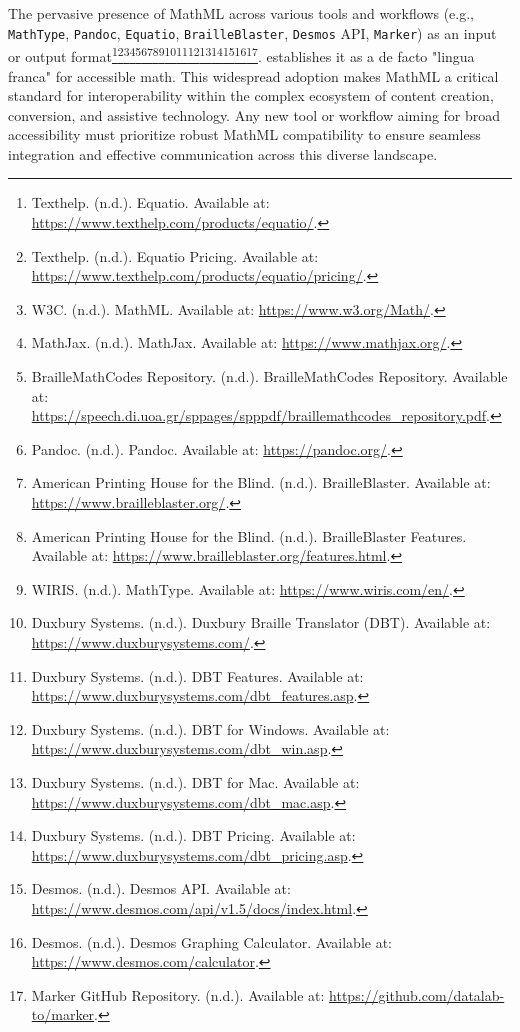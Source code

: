 The pervasive presence of MathML across various tools and workflows (e.g., \texttt{MathType}, \texttt{Pandoc}, \texttt{Equatio}, \texttt{BrailleBlaster}, \texttt{Desmos} API, \texttt{Marker}) as an input or output format\footnote{Texthelp. (n.d.). Equatio. Available at: \url{https://www.texthelp.com/products/equatio/}.}\footnote{Texthelp. (n.d.). Equatio Pricing. Available at: \url{https://www.texthelp.com/products/equatio/pricing/}.}\footnote{W3C. (n.d.). MathML. Available at: \url{https://www.w3.org/Math/}.}\footnote{MathJax. (n.d.). MathJax. Available at: \url{https://www.mathjax.org/}.}\footnote{BrailleMathCodes Repository. (n.d.). BrailleMathCodes Repository. Available at: \url{https://speech.di.uoa.gr/sppages/spppdf/braillemathcodes_repository.pdf}.}\footnote{Pandoc. (n.d.). Pandoc. Available at: \url{https://pandoc.org/}.}\footnote{American Printing House for the Blind. (n.d.). BrailleBlaster. Available at: \url{https://www.brailleblaster.org/}.}\footnote{American Printing House for the Blind. (n.d.). BrailleBlaster Features. Available at: \url{https://www.brailleblaster.org/features.html}.}\footnote{WIRIS. (n.d.). MathType. Available at: \url{https://www.wiris.com/en/}.}\footnote{Duxbury Systems. (n.d.). Duxbury Braille Translator (DBT). Available at: \url{https://www.duxburysystems.com/}.}\footnote{Duxbury Systems. (n.d.). DBT Features. Available at: \url{https://www.duxburysystems.com/dbt_features.asp}.}\footnote{Duxbury Systems. (n.d.). DBT for Windows. Available at: \url{https://www.duxburysystems.com/dbt_win.asp}.}\footnote{Duxbury Systems. (n.d.). DBT for Mac. Available at: \url{https://www.duxburysystems.com/dbt_mac.asp}.}\footnote{Duxbury Systems. (n.d.). DBT Pricing. Available at: \url{https://www.duxburysystems.com/dbt_pricing.asp}.}\footnote{Desmos. (n.d.). Desmos API. Available at: \url{https://www.desmos.com/api/v1.5/docs/index.html}.}\footnote{Desmos. (n.d.). Desmos Graphing Calculator. Available at: \url{https://www.desmos.com/calculator}.}\footnote{Marker GitHub Repository. (n.d.). Available at: \url{https://github.com/datalab-to/marker}.}. establishes it as a de facto "lingua franca" for accessible math. This widespread adoption makes MathML a critical standard for interoperability within the complex ecosystem of content creation, conversion, and assistive technology. Any new tool or workflow aiming for broad accessibility must prioritize robust MathML compatibility to ensure seamless integration and effective communication across this diverse landscape.

